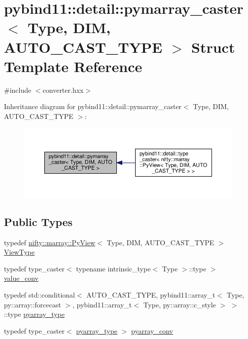 \hypertarget{structpybind11_1_1detail_1_1pymarray__caster}{}\section{pybind11\+:\+:detail\+:\+:pymarray\+\_\+caster$<$ Type, D\+IM, A\+U\+T\+O\+\_\+\+C\+A\+S\+T\+\_\+\+T\+Y\+PE $>$ Struct Template Reference}
\label{structpybind11_1_1detail_1_1pymarray__caster}


{\ttfamily \#include $<$converter.\+hxx$>$}



Inheritance diagram for pybind11\+:\+:detail\+:\+:pymarray\+\_\+caster$<$ Type, D\+IM, A\+U\+T\+O\+\_\+\+C\+A\+S\+T\+\_\+\+T\+Y\+PE $>$\+:
\nopagebreak
\begin{figure}[H]
\begin{center}
\leavevmode
\includegraphics[width=350pt]{structpybind11_1_1detail_1_1pymarray__caster__inherit__graph}
\end{center}
\end{figure}
\subsection*{Public Types}
\begin{DoxyCompactItemize}
\item 
typedef \hyperlink{classnifty_1_1marray_1_1PyView}{nifty\+::marray\+::\+Py\+View}$<$ Type, D\+IM, A\+U\+T\+O\+\_\+\+C\+A\+S\+T\+\_\+\+T\+Y\+PE $>$ \hyperlink{structpybind11_1_1detail_1_1pymarray__caster_a0593b33c0ed08f1b25b34dbc3da1b01c}{View\+Type}
\item 
typedef type\+\_\+caster$<$ typename intrinsic\+\_\+type$<$ Type $>$\+::type $>$ \hyperlink{structpybind11_1_1detail_1_1pymarray__caster_aa57421c8e7e64ab62bac67897f864ea1}{value\+\_\+conv}
\item 
typedef std\+::conditional$<$ A\+U\+T\+O\+\_\+\+C\+A\+S\+T\+\_\+\+T\+Y\+PE, pybind11\+::array\+\_\+t$<$ Type, py\+::array\+::forcecast $>$, pybind11\+::array\+\_\+t$<$ Type, py\+::array\+::c\+\_\+style $>$ $>$\+::type \hyperlink{structpybind11_1_1detail_1_1pymarray__caster_a70ad611a7f6fd17d02b461c43dff6ea0}{pyarray\+\_\+type}
\item 
typedef type\+\_\+caster$<$ \hyperlink{structpybind11_1_1detail_1_1pymarray__caster_a70ad611a7f6fd17d02b461c43dff6ea0}{pyarray\+\_\+type} $>$ \hyperlink{structpybind11_1_1detail_1_1pymarray__caster_a0fe8ba6e31f03c24d130c0dba1a55fa8}{pyarray\+\_\+conv}
\end{DoxyCompactItemize}
